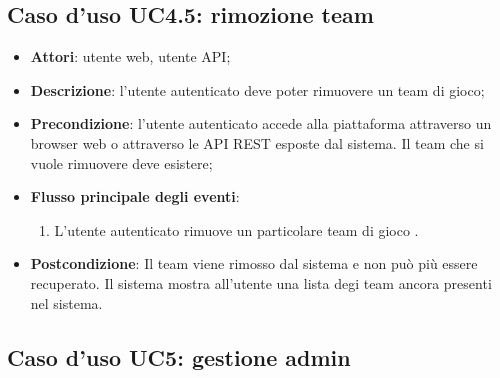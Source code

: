 \subsection{Caso d'uso UC4.5: rimozione team}
\begin{itemize}
\item \textbf{Attori}: utente web, utente API;
\item \textbf{Descrizione}: l'utente autenticato deve poter rimuovere un team di gioco; 
      \item \textbf{Precondizione}: l'utente autenticato accede alla piattaforma attraverso un browser web o attraverso le API REST esposte dal sistema. Il team che si vuole rimuovere deve esistere;

        \item \textbf{Flusso principale degli eventi}:
          \begin{enumerate}
          \item L'utente autenticato rimuove un particolare team di gioco	.

      \end{enumerate}
    \item \textbf{Postcondizione}: Il team viene rimosso dal sistema e non può più essere recuperato. Il sistema mostra all'utente una lista degi team ancora presenti nel sistema.
  \end{itemize}
\hypertarget{UC5}{}
\subsection{Caso d'uso UC5: gestione admin}

